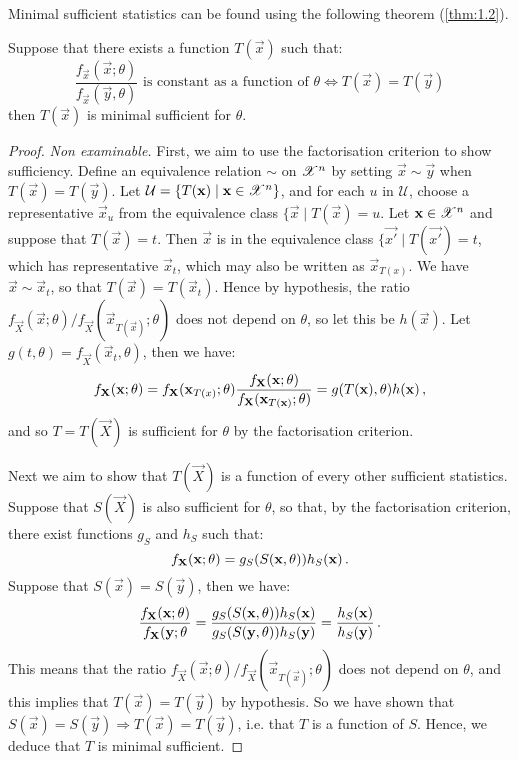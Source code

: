 Minimal sufficient statistics can be found using the following theorem (\ref{thm:1.2}).

\begin{theorem}
  \label{thm:1.2}

  Suppose that there exists a function $T(\vec{x})$ such that:
\[
\frac{f_{\vec{x}}(\vec{x}; \theta)}{f_{\vec{x}}(\vec{y}, \theta)} \text{ is constant as a function of $\theta$} \Leftrightarrow T(\vec{x}) = T(\vec{y})
\]
then $T(\vec{x})$ is minimal sufficient for $\theta$.
\end{theorem}

\begin{proof}
  \emph{Non examinable.} First, we aim to use the factorisation criterion to show sufficiency. Define an equivalence relation $\sim$ on $\mathscr{X}^n$ by setting $\vec{x} \sim \vec{y}$ when $T(\vec{x}) = T(\vec{y})$.
Let $\mathcal{U} = \{ T(\mathbf{x}) \mid \mathbf{x} \in \mathscr{X}^n \}$, and for each $u$ in $\mathcal{U}$, choose a representative $\vec{x}_u$ from the equivalence class $\{ \vec{x} \mid T(\vec{x}) = u$.
Let $\mathbf{x} \in \mathscr{X}^n$ and suppose that $T(\vec{x}) = t$. Then $\vec{x}$ is in the equivalence class $\{\vec{x'} \mid T(\vec{x'}) = t$, which has representative $\vec{x}_t$, which may also be written as $\vec{x}_{T(x)}$.
We have $\vec{x} \sim \vec{x}_t$, so that $T(\vec{x}) = T(\vec{x}_t)$. Hence by hypothesis, the ratio $f_{\vec{X}}(\vec{x}; \theta) / f_{\vec{X}}(\vec{x}_{T(\vec{x})}; \theta)$ does not depend on $\theta$, so let this be $h(\vec{x})$.
Let $g(t, \theta) = f_{\vec{X}}(\vec{x}_t, \theta)$, then we have:
\[
f_{\mathbf{X}}(\mathbf{x}; \theta) = f_{\mathbf{X}}(\mathbf{x}_{T(x)}; \theta)\frac{f_{\mathbf{X}}(\mathbf{x}; \theta)}{f_{\mathbf{X}}(\mathbf{x}_{T(\mathbf{x})}; \theta)} = g(T(\mathbf{x}), \theta)h(\mathbf{x}) \, {,}
\]
and so $T = T(\vec{X})$ is sufficient for $\theta$ by the factorisation criterion.

Next we aim to show that $T(\vec{X})$ is a function of every other sufficient statistics. Suppose that $S(\vec{X})$ is also sufficient for $\theta$, so that, by the factorisation criterion, there exist functions $g_S$ and $h_S$ such that:
\[
f_{\mathbf{X}}(\mathbf{x}; \theta) = g_S(S(\mathbf{x}, \theta))h_S(\mathbf{x})\, {.}
\]
Suppose that $S(\vec{x}) = S(\vec{y})$, then we have:
\[
\frac{f_{\mathbf{X}}(\mathbf{x}; \theta)}{f_{\mathbf{X}}(\mathbf{y}; \theta}
= \frac{g_S(S(\mathbf{x}, \theta))h_S(\mathbf{x})}{g_S(S(\mathbf{y}, \theta))h_S(\mathbf{y})}
= \frac{h_S(\mathbf{x})}{h_S(\mathbf{y})} \, {.}
\]
This means that the ratio $f_{\vec{X}}(\vec{x}; \theta) / f_{\vec{X}}(\vec{x}_{T(\vec{x})}; \theta)$ does not depend on $\theta$, and this implies that $T(\vec{x}) = T(\vec{y})$ by hypothesis. So we have shown that $S(\vec{x}) = S(\vec{y}) \Rightarrow T(\vec{x}) = T(\vec{y})$, i.e. that $T$ is a function of $S$. Hence, we deduce that $T$ is minimal sufficient.
\end{proof}

